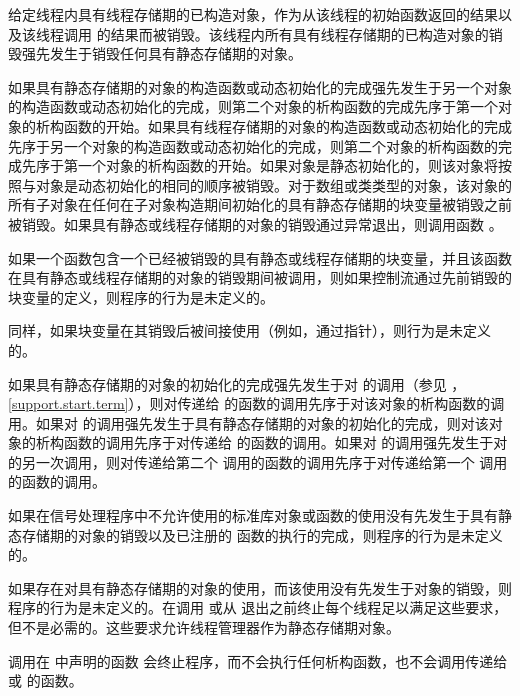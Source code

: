 \pnum
给定线程内具有线程存储期的已构造对象，作为从该线程的初始函数返回的结果以及该线程调用  的结果而被销毁。该线程内所有具有线程存储期的已构造对象的销毁强先发生于销毁任何具有静态存储期的对象。

\pnum
如果具有静态存储期的对象的构造函数或动态初始化的完成强先发生于另一个对象的构造函数或动态初始化的完成，则第二个对象的析构函数的完成先序于第一个对象的析构函数的开始。如果具有线程存储期的对象的构造函数或动态初始化的完成先序于另一个对象的构造函数或动态初始化的完成，则第二个对象的析构函数的完成先序于第一个对象的析构函数的开始。如果对象是静态初始化的，则该对象将按照与对象是动态初始化的相同的顺序被销毁。对于数组或类类型的对象，该对象的所有子对象在任何在子对象构造期间初始化的具有静态存储期的块变量被销毁之前被销毁。如果具有静态或线程存储期的对象的销毁通过异常退出，则调用函数 。

\pnum
如果一个函数包含一个已经被销毁的具有静态或线程存储期的块变量，并且该函数在具有静态或线程存储期的对象的销毁期间被调用，则如果控制流通过先前销毁的块变量的定义，则程序的行为是未定义的。
\begin{note}
同样，如果块变量在其销毁后被间接使用（例如，通过指针），则行为是未定义的。
\end{note}

\pnum
{}%
%
如果具有静态存储期的对象的初始化的完成强先发生于对  的调用（参见 ，\ref{support.start.term}），则对传递给  的函数的调用先序于对该对象的析构函数的调用。如果对  的调用强先发生于具有静态存储期的对象的初始化的完成，则对该对象的析构函数的调用先序于对传递给  的函数的调用。如果对  的调用强先发生于对  的另一次调用，则对传递给第二个  调用的函数的调用先序于对传递给第一个  调用的函数的调用。

\pnum
如果在信号处理程序中不允许使用的标准库对象或函数的使用没有先发生于具有静态存储期的对象的销毁以及已注册的  函数的执行的完成，则程序的行为是未定义的。
\begin{note}
如果存在对具有静态存储期的对象的使用，而该使用没有先发生于对象的销毁，则程序的行为是未定义的。在调用  或从  退出之前终止每个线程足以满足这些要求，但不是必需的。这些要求允许线程管理器作为静态存储期对象。
\end{note}

\pnum
{}%
%
%
调用在  中声明的函数  会终止程序，而不会执行任何析构函数，也不会调用传递给  或  的函数。%
%
